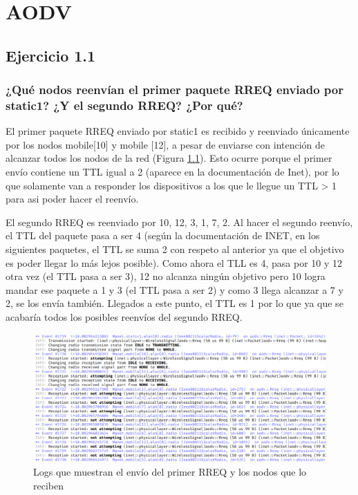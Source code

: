 \chapter{AODV}
\label{chap:aodv}

\section{Ejercicio 1.1}

\subsection{¿Qué nodos reenvían el primer paquete RREQ enviado por static1? ¿Y el segundo RREQ? ¿Por qué?}

El primer paquete RREQ enviado por static1 es recibido y reenviado únicamente por los nodos mobile[10] y mobile [12], a pesar de enviarse con intención de alcanzar todos los nodos de la red (Figura \ref{fig:primer_rreq_reception}). Esto ocurre porque el primer envío contiene un TTL igual a 2 (aparece en la documentación de Inet), por lo que solamente van a responder los dispositivos a los que le llegue un TTL > 1 para asi poder hacer el reenvío.

El segundo RREQ es reenviado por 10, 12, 3, 1, 7, 2. Al hacer el segundo reenvío, el TTL del paquete pasa a ser 4 (según la documentación de INET, en los siguientes paquetes, el TTL se suma 2 con respeto al anterior ya que el objetivo es poder llegar lo más lejos posible). Como ahora el TLL es 4, pasa por 10 y 12 otra vez (el TTL pasa a ser 3), 12 no alcanza ningún objetivo pero 10 logra mandar ese paquete a 1 y 3 (el TTL pasa a ser 2) y como 3 llega alcanzar a 7 y 2, se los envía también. Llegados a este punto, el TTL es 1 por lo que ya que se acabaría todos los posibles reenvíos del segundo RREQ.

\begin{figure}[H]
    \centering
    \includegraphics[width=135mm, scale=0.75]{imaxes/ejercicio1_1.png}
    \caption{Logs que muestran el envío del primer RREQ y los nodos que lo reciben}
    \label{fig:primer_rreq_reception}
\end{figure}

